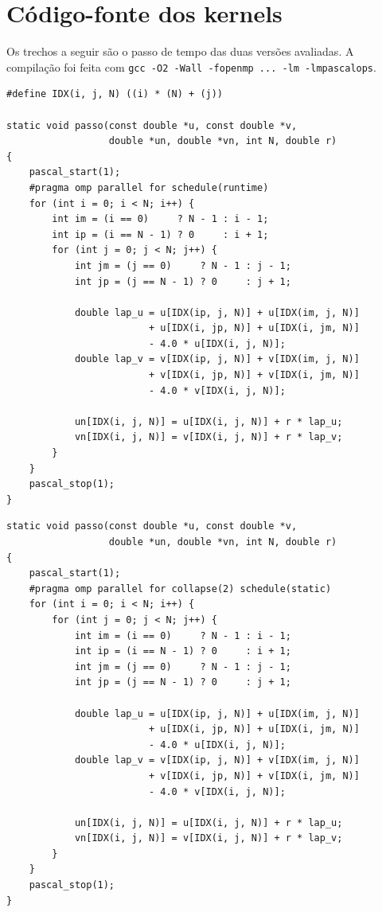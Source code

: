 \documentclass[a4paper,12pt]{article}
\begin{document}
\newpage
\appendix

\section{Código-fonte dos kernels}
\label{ap:codigo}

Os trechos a seguir são o passo de tempo das duas versões avaliadas. A
compilação foi feita com \texttt{gcc -O2 -Wall -fopenmp ... -lm -lmpascalops}.

\begin{lstlisting}[style=cstyle, caption={Versão \texttt{schedule}: paralelismo apenas no laço externo}, label={lst:sched}]
#define IDX(i, j, N) ((i) * (N) + (j))

static void passo(const double *u, const double *v,
                  double *un, double *vn, int N, double r)
{
    pascal_start(1);
    #pragma omp parallel for schedule(runtime)
    for (int i = 0; i < N; i++) {
        int im = (i == 0)     ? N - 1 : i - 1;
        int ip = (i == N - 1) ? 0     : i + 1;
        for (int j = 0; j < N; j++) {
            int jm = (j == 0)     ? N - 1 : j - 1;
            int jp = (j == N - 1) ? 0     : j + 1;

            double lap_u = u[IDX(ip, j, N)] + u[IDX(im, j, N)]
                         + u[IDX(i, jp, N)] + u[IDX(i, jm, N)]
                         - 4.0 * u[IDX(i, j, N)];
            double lap_v = v[IDX(ip, j, N)] + v[IDX(im, j, N)]
                         + v[IDX(i, jp, N)] + v[IDX(i, jm, N)]
                         - 4.0 * v[IDX(i, j, N)];

            un[IDX(i, j, N)] = u[IDX(i, j, N)] + r * lap_u;
            vn[IDX(i, j, N)] = v[IDX(i, j, N)] + r * lap_v;
        }
    }
    pascal_stop(1);
}
\end{lstlisting}

\begin{lstlisting}[style=cstyle, caption={Versão \texttt{collapse}: laços \texttt{i} e \texttt{j} fundidos}, label={lst:coll}]
static void passo(const double *u, const double *v,
                  double *un, double *vn, int N, double r)
{
    pascal_start(1);
    #pragma omp parallel for collapse(2) schedule(static)
    for (int i = 0; i < N; i++) {
        for (int j = 0; j < N; j++) {
            int im = (i == 0)     ? N - 1 : i - 1;
            int ip = (i == N - 1) ? 0     : i + 1;
            int jm = (j == 0)     ? N - 1 : j - 1;
            int jp = (j == N - 1) ? 0     : j + 1;

            double lap_u = u[IDX(ip, j, N)] + u[IDX(im, j, N)]
                         + u[IDX(i, jp, N)] + u[IDX(i, jm, N)]
                         - 4.0 * u[IDX(i, j, N)];
            double lap_v = v[IDX(ip, j, N)] + v[IDX(im, j, N)]
                         + v[IDX(i, jp, N)] + v[IDX(i, jm, N)]
                         - 4.0 * v[IDX(i, j, N)];

            un[IDX(i, j, N)] = u[IDX(i, j, N)] + r * lap_u;
            vn[IDX(i, j, N)] = v[IDX(i, j, N)] + r * lap_v;
        }
    }
    pascal_stop(1);
}
\end{lstlisting}
\end{document}
